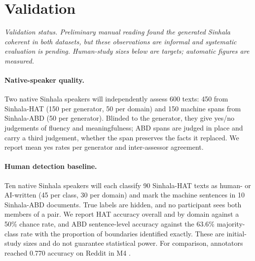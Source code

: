 %

\section{Validation}
\label{sec:validation}

\noindent\textit{Validation status. Preliminary manual reading found the
generated Sinhala coherent in both datasets, but these observations are
informal and systematic evaluation is pending. Human-study sizes below are
targets; automatic figures are measured.}

\paragraph{Native-speaker quality.}
Two native Sinhala speakers will independently assess 600 texts: 450 from
Sinhala-HAT (150 per generator, 50 per domain) and 150 machine spans from
Sinhala-ABD (50 per generator). Blinded to the generator, they give yes/no
judgements of fluency and meaningfulness; ABD spans are judged in place and
carry a third judgement, whether the span preserves the facts it replaced. We
report mean yes rates per generator and inter-assessor agreement.

\paragraph{Human detection baseline.}
Ten native Sinhala speakers will each classify 90 Sinhala-HAT texts as human- or
AI-written (45 per class, 30 per domain) and mark the machine sentences in 10
Sinhala-ABD documents. True labels are hidden, and no participant sees both
members of a pair. We report HAT accuracy overall and by domain against a 50\%
chance rate, and ABD sentence-level accuracy against the 63.6\% majority-class
rate with the proportion of boundaries identified exactly. These are
initial-study sizes and do not guarantee statistical power. For comparison,
annotators reached 0.770 accuracy on Reddit in M4 \citep{wang2024m4}.

